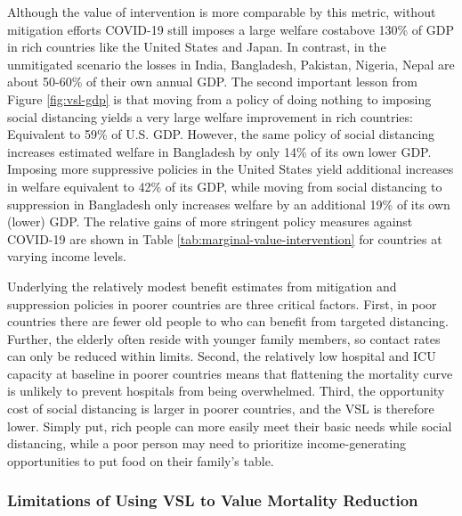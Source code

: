 \documentclass[11pt]{article}
\begin{document}
Although the value of intervention is more comparable by this metric, without mitigation efforts COVID-19 still imposes a large welfare cost\textemdash above 130\% of GDP in rich countries like the United States and Japan. In contrast, in the unmitigated scenario the losses in India, Bangladesh, Pakistan, Nigeria, Nepal are about 50-60\% of their own annual GDP. The second important lesson from Figure \ref{fig:vsl-gdp} is that moving from a policy of doing nothing to imposing social distancing yields a very large welfare improvement in rich countries: Equivalent to 59\% of U.S. GDP. However, the same policy of social distancing increases estimated welfare in Bangladesh by only 14\% of its own lower GDP. Imposing more suppressive policies in the United States yield additional increases in welfare equivalent to 42\% of its GDP, while moving from social distancing to suppression in Bangladesh only increases welfare by an additional 19\% of its own (lower) GDP. The relative gains of more stringent policy measures against COVID-19 are shown in Table \ref{tab:marginal-value-intervention} for countries at varying income levels. 

Underlying the relatively modest benefit estimates from mitigation and suppression policies in poorer countries are three critical factors. First, in poor countries there are fewer old people to who can benefit from targeted distancing. Further, the elderly often reside with younger family members, so contact rates can only be reduced within limits. Second, the relatively low hospital and ICU capacity at baseline in poorer countries means that flattening the mortality curve is unlikely to prevent hospitals from being overwhelmed. Third, the opportunity cost of social distancing is larger in poorer countries, and the VSL is therefore lower. Simply put, rich people can more easily meet their basic needs while social distancing, while a poor person may need to prioritize income-generating opportunities to put food on their family's table.

\subsubsection{Limitations of Using VSL to Value Mortality Reduction}
\end{document}
